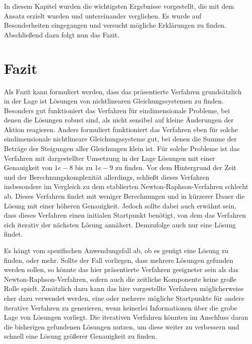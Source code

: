 \documentclass{article}
\theoremstyle{newline}
\begin{document}
\begin{onehalfspace}
In diesem Kapitel wurden die wichtigsten Ergebnisse vorgestellt, die mit dem Ansatz erzielt wurden und untereinander verglichen. Es wurde auf Besonderheiten eingegangen und versucht mögliche Erklärungen zu finden. Abschließend dazu folgt nun das Fazit.


\section{Fazit}

Als Fazit kann formuliert werden, dass das präsentierte Verfahren grundsätzlich in der Lage ist Lösungen von nichtlinearen Gleichungssystemen zu finden. Besonders gut funktioniert das Verfahren für eindimensionale Probleme, bei denen die Lösungen robust sind, als nicht sensibel auf kleine Änderungen der Aktion reagieren. Anders formuliert funktioniert das Verfahren eben für solche eindimensionale nichtlineare Gleichungssysteme gut, bei denen die Summe der Beträge der Steigungen aller Gleichungen klein ist. Für solche Probleme ist das Verfahren mit dargestellter Umsetzung in der Lage Lösungen mit einer Genauigkeit von $1e-8$ bis zu $1e-9$ zu finden. Vor dem Hintergrund der Zeit und der Berechnungskomplexität allerdings, schließt dieses Verfahren insbesondere im Vergleich zu dem etablierten Newton-Raphson-Verfahren schlecht ab. Dieses Verfahren findet mit weniger Berechnungen und in kürzerer Dauer die Lösung mit einer höheren Genauigkeit. Jedoch sollte dabei auch erwähnt sein, dass dieses Verfahren einen initialen Startpunkt benötigt, von dem das Verfahren sich iterativ der nächsten Lösung annähert. Demzufolge auch nur eine Lösung findet. 

Es hängt vom spezifischen Anwendungsfall ab, ob es genügt eine Lösung zu finden, oder mehr. Sollte der Fall vorliegen, dass mehrere Lösungen gefunden werden sollen, so könnte das hier präsentierte Verfahren geeigneter sein als das Newton-Raphson-Verfahren, sofern auch die zeitliche Komponente keine große Rolle spielt. Zusätzlich dazu kann das hier vorgestellte Verfahren möglicherweise eher dazu verwendet werden, eine oder mehrere mögliche Startpunkte für andere iterative Verfahren zu generieren, wenn keinerlei Informationen über die grobe Lage von Lösungen vorliegt. Die iterativen Verfahren könnten im Anschluss daran die bisherigen gefundenen Lösungen nutzen, um diese weiter zu verbessern und schnell eine Lösung größerer Genauigkeit zu finden.
\medskip


\end{onehalfspace}
\end{document}
